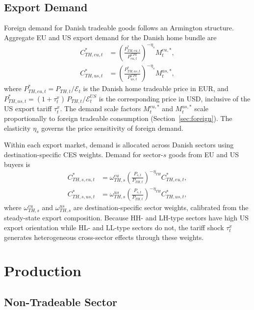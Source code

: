 \documentclass[12pt,a4paper]{article}
\begin{document}
\subsection{Export Demand}

Foreign demand for Danish tradeable goods follows an Armington structure. Aggregate EU and US export demand for the Danish home bundle are
\begin{align}
    C^*_{TH,eu,t} &= \left(\frac{P^*_{TH,eu,t}}{P^{CPI}_{eu,t}}\right)^{-\eta_s} M^{eu,*}_t,
    \label{eq:exp_eu}\\
    C^*_{TH,us,t} &= \left(\frac{P^*_{TH,us,t}}{P^{CPI}_{us,t}}\right)^{-\eta_s} M^{us,*}_t,
    \label{eq:exp_us}
\end{align}
where $P^*_{TH,eu,t} = P_{TH,t}/\mathcal{E}_t$ is the Danish home tradeable price in EUR, and $P^*_{TH,us,t} = (1+\tau^x_t)\,P_{TH,t}/\mathcal{E}^{US}_t$ is the corresponding price in USD, inclusive of the US export tariff $\tau^x_t$. The demand scale factors $M^{eu,*}_t$ and $M^{us,*}_t$ scale proportionally to foreign tradeable consumption (Section~\ref{sec:foreign}). The elasticity $\eta_s$ governs the price sensitivity of foreign demand.

Within each export market, demand is allocated across Danish sectors using destination-specific CES weights. Demand for sector-$s$ goods from EU and US buyers is
\begin{align}
    C^*_{TH,s,eu,t} &= \omega^{eu}_{TH,s}\left(\frac{P_{s,t}}{P_{TH,t}}\right)^{-\eta_{TH}} C^*_{TH,eu,t},
    \label{eq:exp_s_eu}\\
    C^*_{TH,s,us,t} &= \omega^{us}_{TH,s}\left(\frac{P_{s,t}}{P_{TH,t}}\right)^{-\eta_{TH}} C^*_{TH,us,t},
    \label{eq:exp_s_us}
\end{align}
where $\omega^{eu}_{TH,s}$ and $\omega^{us}_{TH,s}$ are destination-specific sector weights, calibrated from the steady-state export composition. Because HH- and LH-type sectors have high US export orientation while HL- and LL-type sectors do not, the tariff shock $\tau^x_t$ generates heterogeneous cross-sector effects through these weights.


\section{Production}
\label{sec:production}

\subsection{Non-Tradeable Sector}
\end{document}
